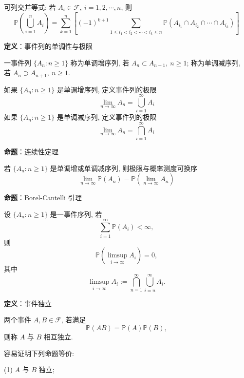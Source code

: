 \documentclass[openany]{ctexbook}
\theoremstyle{kaiti}
\theoremstyle{normal}
\begin{document}
可列交并等式: 若 $A_i\in\mathcal{F},~i=1,2,\cdots,n$, 则
\begin{equation}
  \mathbb{P}\left(\bigcup_{i=1}^n A_i\right)=\sum_{k=1}^n\left[ (-1)^{k+1}\sum_{1\leqslant i_1<i_2<\cdots<i_k\leqslant n}\mathbb{P}\left(A_{i_1}\cap A_{i_2}\cap\cdots\cap A_{i_k}\right)\right]
\end{equation}

\textbf{定义}：事件列的单调性与极限

一事件列 $\{A_n:n\geqslant1\}$ 称为单调增序列, 若 $A_n\subset A_{n+1},~n\geqslant1$; 称为单调减序列, 若 $A_n\supset A_{n+1},~n\geqslant1$. 

如果 $\{A_n:n\geqslant1\}$ 是单调增序列, 定义事件列的极限
\begin{equation}
  \lim_{n\to\infty}A_n=\bigcup_{i=1}^\infty A_i
\end{equation}
如果 $\{A_n:n\geqslant1\}$ 是单调减序列, 定义事件列的极限
\begin{equation}
  \lim_{n\to\infty}A_n=\bigcap_{i=1}^\infty A_i
\end{equation}

\textbf{命题}：连续性定理

若 $\{A_n:n\geqslant1\}$ 是单调增或单调减序列, 则极限与概率测度可换序
\begin{equation}
  \lim_{n\to\infty}\mathbb{P}(A_n)=\mathbb{P}\left(\lim_{n\to\infty}A_n\right)
\end{equation}

\textbf{命题}：Borel-Cantelli 引理

设 $\{A_n:n\geqslant1\}$ 是一事件序列, 若
\begin{equation}
  \sum_{i=1}^\infty \mathbb{P}(A_i)<\infty,
\end{equation}
则
\begin{equation}
  \mathbb{P}\left(\limsup_{i\to\infty}A_i\right)=0,
\end{equation}
其中
\begin{equation}
  \limsup_{i\to\infty}A_i:=\bigcap_{n=1}^\infty\bigcup_{i=n}^\infty A_i.
\end{equation}

\textbf{定义}：事件独立

两个事件 $A,B\in\mathcal{F}$, 若满足
\begin{equation}
  \mathbb{P}(AB)=\mathbb{P}(A)\mathbb{P}(B),
\end{equation}
则称 $A$ 与 $B$ 相互独立. 

容易证明下列命题等价:

(1) $A$ 与 $B$ 独立;
\end{document}
